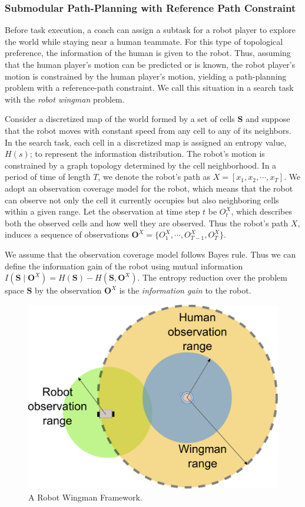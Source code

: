 \documentclass[phd]{byuprop}
\begin{document}
\subsubsection{Submodular Path-Planning with Reference Path Constraint}
\label{sec:project_description:submodular_path_planning_with_reference_path_constraint}

Before task execution, a coach can assign a subtask for a robot player to explore the world while staying near a human teammate.
For this type of topological preference, the information of the human is given to the robot.
Thus, assuming that the human player's motion can be predicted or is known, the robot player's motion is constrained by the human player's motion, yielding a path-planning problem with a reference-path constraint.
We call this situation in a search task with the {\em robot wingman} problem.

Consider a discretized map of the world formed by a set of cells $ \mathbf{S}$ and suppose that the robot moves with constant speed from any cell to any of its neighbors.
In the search task, each cell in a discretized map is assigned an entropy value, $ H(s) $; to represent the information distribution.
The robot's motion is constrained by a graph topology determined by the cell neighborhood. 
In a period of time of length $ T $, we denote the robot's path as $ X = [x_{1}, x_{2} , \cdots , x_{T}] $.
We adopt an observation coverage model for the robot, which means that the robot can observe not only the cell it currently occupies but also neighboring cells within a given range.
Let the observation at time step $ t $ be $ O^{X}_{t} $, which describes both the observed cells and how well they are observed.
Thus the robot's path $X$, induces a sequence of observations $ \mathbf{O}^{X} = \{ O^{X}_{1}, \cdots , O^{X}_{T-1}, O^{X}_{T} \}$.

We assume that the observation coverage model follows Bayes rule.
Thus we can define the information gain of the robot using mutual information $ I( \mathbf{S} \mid \mathbf{O}^{X} ) =  H( \mathbf{S} ) - H( \mathbf{S}, \mathbf{O}^{X}  ) $.
The entropy reduction over the problem space $ \mathbf{S} $ by the observation $ \mathbf{O}^{X} $ is the {\em information gain} to the robot.

\begin{figure}[hbtp]
\centering
\includegraphics[width=0.37\linewidth]{./fig/Wingman.pdf}
\caption{A Robot Wingman Framework.}
\label{fig:Wingman}
\end{figure}
\end{document}
